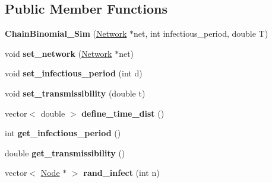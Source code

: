 \subsection*{Public Member Functions}
\begin{DoxyCompactItemize}
\item 
\hypertarget{classChainBinomial__Sim_a3d8360a4accc75a1fd05358cfea134c7}{}{\bfseries Chain\+Binomial\+\_\+\+Sim} (\hyperlink{classNetwork}{Network} $\ast$net, int infectious\+\_\+period, double T)\label{classChainBinomial__Sim_a3d8360a4accc75a1fd05358cfea134c7}

\item 
\hypertarget{classChainBinomial__Sim_a7194af935f019e49e73858f726fb7db3}{}void {\bfseries set\+\_\+network} (\hyperlink{classNetwork}{Network} $\ast$net)\label{classChainBinomial__Sim_a7194af935f019e49e73858f726fb7db3}

\item 
\hypertarget{classChainBinomial__Sim_acb28925f5ef15976df7bd74bb5f475f5}{}void {\bfseries set\+\_\+infectious\+\_\+period} (int d)\label{classChainBinomial__Sim_acb28925f5ef15976df7bd74bb5f475f5}

\item 
\hypertarget{classChainBinomial__Sim_a42bcc404ba9b7fa3dfe09bc261c18555}{}void {\bfseries set\+\_\+transmissibility} (double t)\label{classChainBinomial__Sim_a42bcc404ba9b7fa3dfe09bc261c18555}

\item 
\hypertarget{classChainBinomial__Sim_a20bc89bd36f687b0fbf26eb0d791c942}{}vector$<$ double $>$ {\bfseries define\+\_\+time\+\_\+dist} ()\label{classChainBinomial__Sim_a20bc89bd36f687b0fbf26eb0d791c942}

\item 
\hypertarget{classChainBinomial__Sim_a170153814fa16f65545aa9d84efc5d8a}{}int {\bfseries get\+\_\+infectious\+\_\+period} ()\label{classChainBinomial__Sim_a170153814fa16f65545aa9d84efc5d8a}

\item 
\hypertarget{classChainBinomial__Sim_af3a446813e5877097ae19eef01f42035}{}double {\bfseries get\+\_\+transmissibility} ()\label{classChainBinomial__Sim_af3a446813e5877097ae19eef01f42035}

\item 
\hypertarget{classChainBinomial__Sim_a014207862000aa1ce033f151fa8bee66}{}vector$<$ \hyperlink{classNode}{Node} $\ast$ $>$ {\bfseries rand\+\_\+infect} (int n)\label{classChainBinomial__Sim_a014207862000aa1ce033f151fa8bee66}


\end{DoxyCompactItemize}
